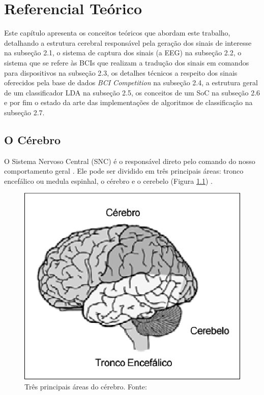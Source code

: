 
\chapter[Referencial Teórico]{Referencial Teórico}
Este capítulo apresenta os conceitos teóricos que abordam este trabalho, detalhando a estrutura cerebral responsável pela geração dos sinais de interesse na subseção 2.1, o sistema de captura dos sinais (a EEG) na subseção 2.2, o sistema que se refere às BCIs que realizam a tradução dos sinais em comandos para dispositivos na subseção 2.3, os detalhes técnicos a respeito dos sinais oferecidos pela base de dados \textit{BCI Competition} na subseção 2.4, a estrutura geral de um classificador LDA na subseção 2.5, os conceitos de um SoC na subseção 2.6 e por fim o estado da arte das implementações de algoritmos de classificação na subseção 2.7. 

\section{O Cérebro}
O Sistema Nervoso Central (SNC) é o responsável direto pelo comando do nosso comportamento geral \cite{David_Clarck}. Ele pode ser dividido em três principais áreas: tronco encefálico ou medula espinhal, o cérebro e o cerebelo (Figura \ref{BrainParts}) \cite{alvarezneurobiomecanismos}.

\begin{figure}[h]
	\centering
	\includegraphics[keepaspectratio=true,scale=1.0]{figuras/estrutura_cerebral.eps}
	\caption{Três principais áreas do cérebro. Fonte: \cite{alvarezneurobiomecanismos}}
	\label{BrainParts}
\end{figure}

